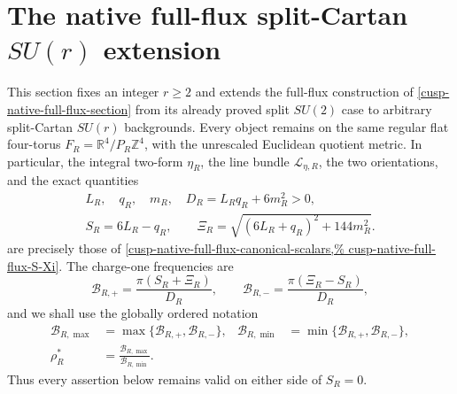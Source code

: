 

\section{The native full-flux split-Cartan \texorpdfstring{\(SU(r)\)}{SU(r)} extension}
\label{cusp-native-full-flux-suN-section}

This section fixes an integer \(r\geq2\) and extends the full-flux
construction of \cref{cusp-native-full-flux-section} from its already proved
split \(SU(2)\) case to arbitrary split-Cartan \(SU(r)\) backgrounds.  Every
object remains on the same regular flat four-torus
\(F_R=\mathbb R^4/P_R\mathbb Z^4\), with the unrescaled Euclidean quotient
metric.  In particular, the integral two-form \(\eta_R\), the line bundle
\(\mathscr L_{\eta,R}\), the two orientations, and the exact quantities
\[
 \begin{gathered}
  L_R,\quad q_R,\quad m_R,\quad D_R=L_R q_R+6m_R^2>0,\\
  S_R=6L_R-q_R,\qquad
  \Xi_R=\sqrt{(6L_R+q_R)^2+144m_R^2}.
 \end{gathered}
\]
are precisely those of
\cref{cusp-native-full-flux-canonical-scalars,%
cusp-native-full-flux-S-Xi}.  The charge-one frequencies are
\begin{equation}
 \mathcal B_{R,+}=\frac{\pi(S_R+\Xi_R)}{D_R},
 \qquad
 \mathcal B_{R,-}=\frac{\pi(\Xi_R-S_R)}{D_R},
 \label{cusp-native-full-flux-suN-signed-frequencies}
\end{equation}
and we shall use the globally ordered notation
\begin{equation}
 \begin{aligned}
  \mathcal B_{R,\max}
  &=\max\{\mathcal B_{R,+},\mathcal B_{R,-}\},&
  \mathcal B_{R,\min}
  &=\min\{\mathcal B_{R,+},\mathcal B_{R,-}\},\\
  \rho_R^*&=\frac{\mathcal B_{R,\max}}{\mathcal B_{R,\min}}.
 \end{aligned}
 \label{cusp-native-full-flux-suN-ordered-frequencies}
\end{equation}
Thus every assertion below remains valid on either side of \(S_R=0\).

